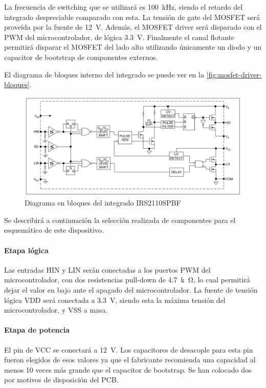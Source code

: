 \documentclass[../et.tex]{subfiles}
\begin{document}
  La frecuencia de switching que se utilizará es \SI{100}{kHz}, siendo el retardo del integrado despreciable comparado con esta. La tensión de gate del MOSFET será proveída por la fuente de \SI{12}{V}. Además, el MOSFET driver será disparado con el PWM del microcontrolador, de lógica \SI{3.3}{V}. Finalmente el canal flotante permitirá disparar el MOSFET del lado alto utilizando únicamente un diodo y un capacitor de bootstrap de componentes externos.

  El diagrama de bloques interno del integrado se puede ver en la \autoref{fig:mosfet-driver-bloques}.

    \begin{figure}[!htbp]
      \centering
      \includegraphics[scale=0.4]{../images/mosfet-driver-bloques.png}
      \caption{Diagrama en bloques del integrado IRS2110SPBF}
      \label{fig:mosfet-driver-bloques}
    \end{figure}

  Se describirá a continuación la selección realizada de componentes para el esquemático de este dispositivo.

    \paragraph{Etapa lógica} Las entradas HIN y LIN serán conectadas a los puertos PWM del microcontrolador, con dos resistencias pull-down de \SI{4.7}{k\ohm}, lo cual permitirá dejar el valor en bajo ante el apagado del microcontrolador. La fuente de tensión lógica VDD será conectada a \SI{3.3}{V}, siendo esta la máxima tensión del microcontrolador, y VSS a masa.

    \paragraph{Etapa de potencia}
    El pin de VCC se conectará a \SI{12}{V}. Los capacitores de desacople para esta pin fueron elegidos de esos valores ya que el fabricante recomienda una capacidad al menos 10 veces más grande que el capacitor de bootstrap. Se han colocado dos por motivos de disposición del PCB.
\end{document}
